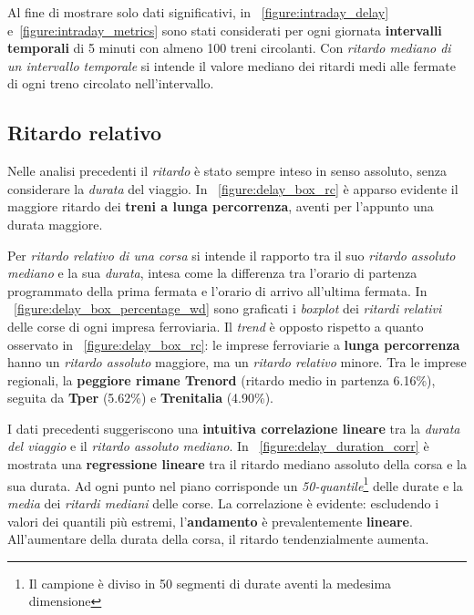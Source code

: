 \documentclass[12pt,a4paper,italian]{report}
\begin{document}
Al fine di mostrare solo dati significativi, in
\figurename~\ref{figure:intraday_delay}
e~\ref{figure:intraday_metrics} sono stati considerati per ogni
giornata \textbf{intervalli temporali} di 5 minuti con almeno 100
treni circolanti.  Con \textit{ritardo mediano di un intervallo
    temporale} si intende il valore mediano dei ritardi medi alle
fermate di ogni treno circolato nell'intervallo.

\subsection{Ritardo relativo}
\label{ritardo_relativo}

Nelle analisi precedenti il \textit{ritardo} è stato sempre inteso in
senso assoluto, senza considerare la \textit{durata} del viaggio.  In
\figurename~\ref{figure:delay_box_rc} è apparso evidente il maggiore
ritardo dei \textbf{treni a lunga percorrenza}, aventi per l'appunto
una durata maggiore.

Per \textit{ritardo relativo di una corsa} si intende il rapporto tra
il suo \textit{ritardo assoluto mediano} e la sua \textit{durata},
intesa come la differenza tra l'orario di partenza programmato della
prima fermata e l'orario di arrivo all'ultima fermata.  In
\figurename~\ref{figure:delay_box_percentage_wd} sono graficati i
\textit{boxplot} dei \textit{ritardi relativi} delle corse di ogni
impresa ferroviaria.  Il \textit{trend} è opposto rispetto a quanto
osservato in \figurename~\ref{figure:delay_box_rc}: le imprese
ferroviarie a \textbf{lunga percorrenza} hanno un \textit{ritardo
    assoluto} maggiore, ma un \textit{ritardo relativo} minore.  Tra
le imprese regionali, la \textbf{peggiore rimane Trenord} (ritardo
medio in partenza 6.16\%), seguita da \textbf{Tper} (5.62\%) e
\textbf{Trenitalia} (4.90\%).

I dati precedenti suggeriscono una \textbf{intuitiva correlazione
    lineare} tra la \textit{durata del viaggio} e il \textit{ritardo
    assoluto mediano}.  In
\figurename~\ref{figure:delay_duration_corr} è mostrata una
\textbf{regressione lineare} tra il ritardo mediano assoluto della
corsa e la sua durata.  Ad ogni punto nel piano corrisponde un
\textit{50-quantile}\footnote{Il campione è diviso in 50 segmenti di
    durate aventi la medesima dimensione} delle durate e la
\textit{media} dei \textit{ritardi mediani} delle corse.  La
correlazione è evidente: escludendo i valori dei quantili più estremi,
l'\textbf{andamento} è prevalentemente \textbf{lineare}.
All'aumentare della durata della corsa, il ritardo tendenzialmente
aumenta.
\end{document}
